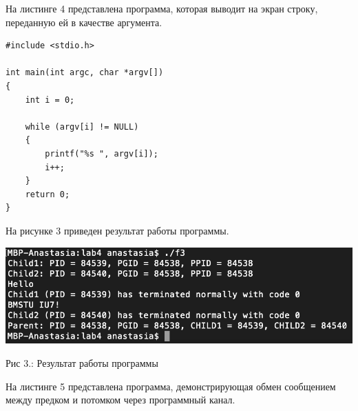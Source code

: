 \documentclass[12pt]{report}
\begin{document}
На листинге 4 представлена программа, которая выводит на экран строку, переданную ей в качестве аргумента.

\begin{lstlisting}[label=some-code,caption=Программа print.c]
#include <stdio.h>

int main(int argc, char *argv[])
{
    int i = 0;
  
    while (argv[i] != NULL)
    {
        printf("%s ", argv[i]);
        i++;
    }
    return 0;
}

\end{lstlisting}

На рисунке 3 приведен результат работы программы.
\begin{center}
		\includegraphics[scale=0.8]{pics/proc3.png}
		
			Рис 3.:  Результат работы программы
\end{center}

На листинге 5 представлена программа, демонстрирующая обмен сообщением между предком и потомком через программный канал.
\end{document}
